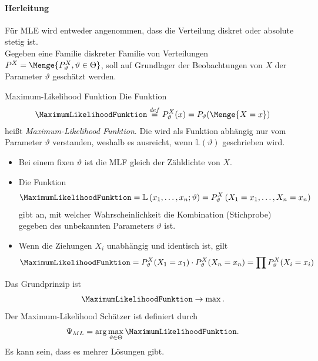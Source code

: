 \paragraph{Herleitung}
Für \gls{MLE} wird entweder angenommen, dass die Verteilung diskret oder absolute stetig ist.\\

Gegeben eine Familie diskreter Familie von Verteilungen $P^X = \Menge{P^X_\vartheta, \vartheta\in\Theta}$, soll auf Grundlager der Beobachtungen von $X$ der Parameter $\vartheta$ geschätzt werden. 

\begin{Definition}{Maximum-Likelihood Funktion}
	Die Funktion
	\begin{align}
	 \MaximumLikelihoodFunktion \stackrel{def}{=} P^X_\vartheta(x) = P_\vartheta(\Menge{X=x})
	\end{align}
	heißt \textit{Maximum-Likelihood Funktion}. Die \MaximumLikelihoodFunktion wird als Funktion abhängig nur vom Parameter $\vartheta$ verstanden, weshalb es ausreicht, wenn $\mathbb{L}(\vartheta)$ geschrieben wird.
\end{Definition}
\begin{itemize}
	\item Bei einem fixen $\vartheta$ ist die \gls{MLF} gleich der Zähldichte von $X$.
	\item Die Funktion 
	\begin{align}
		\MaximumLikelihoodFunktion = \mathbb{L}\left(x_1,\dots,x_n;\vartheta \right) = P^X_\vartheta\left(X_1=x_1, \dots, X_n=x_n\right)
	\end{align}
	gibt an, mit welcher Wahrscheinlichkeit die Kombination (Stichprobe) gegeben des unbekannten Parameters $\vartheta$ ist.
	\item Wenn die Ziehungen $X_i$ unabhängig und identisch ist, gilt
	\begin{align}
		\MaximumLikelihoodFunktion =  P^X_\vartheta(X_1=x_1)\cdot P^X_\vartheta(X_n=x_n) = \prod P^X_\vartheta(X_i=x_i)
	\end{align}
\end{itemize}

Das Grundprinzip ist
\begin{align}
	\MaximumLikelihoodFunktion \rightarrow \max.
\end{align}
Der Maximum-Likelihood Schätzer ist definiert durch
\begin{align}
	\Psi_{ML} = \arg\max_{\vartheta\in \Theta} \MaximumLikelihoodFunktion.
\end{align}
Es kann sein, dass es mehrer Lösungen gibt.


